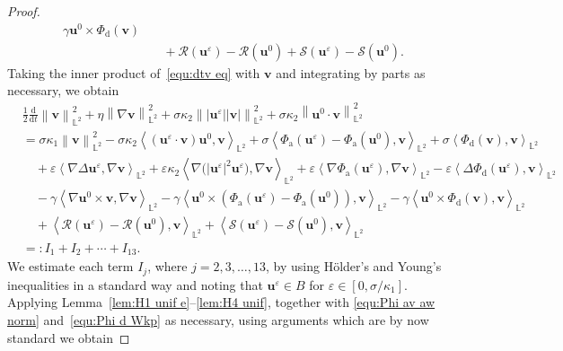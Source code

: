 \documentclass[11pt, reqno]{amsart}
\theoremstyle{definition}
\numberwithin{equation}{section}
\newcommand{\bff}{\boldsymbol}
\newcommand{\bb}{\mathbb}
\newcommand{\ddt}{\frac{\mathrm{d}}{\mathrm{d}t}}
\newcommand{\norm}[2]{\left\|{#1}\right\|_{#2}}
\newcommand{\inpro}[2]{\left\langle#1,#2\right\rangle}
\begin{document}
\begin{proof}
\begin{align}
    \gamma \bff{u}^0 \times \Phi_{\mathrm{d}}(\bff{v})
    \nonumber\\
    &\quad
    +
    \mathcal{R}(\bff{u}^\varepsilon)- \mathcal{R}(\bff{u}^0)
    +
    \mathcal{S}(\bff{u}^\varepsilon)- \mathcal{S}(\bff{u}^0).
\end{align}
Taking the inner product of~\eqref{equ:dtv eq} with $\bff{v}$ and integrating by parts as necessary, we obtain
\begin{align}\label{equ:I1 to I12 Se}
    &\frac12 \ddt \norm{\bff{v}}{\bb{L}^2}^2
    +
    \eta \norm{\nabla \bff{v}}{\bb{L}^2}^2
    +
    \sigma\kappa_2 \norm{|\bff{u}^\varepsilon| |\bff{v}|}{\bb{L}^2}^2
    +
    \sigma\kappa_2 \norm{\bff{u}^0 \cdot \bff{v}}{\bb{L}^2}^2
    \nonumber\\
    &=
    \sigma\kappa_1 \norm{\bff{v}}{\bb{L}^2}^2
    -
    \sigma\kappa_2 \inpro{(\bff{u}^\varepsilon \cdot \bff{v})\bff{u}^0}{\bff{v}}_{\bb{L}^2}
    +
    \sigma \inpro{\Phi_{\mathrm{a}}(\bff{u}^\varepsilon)- \Phi_{\mathrm{a}}(\bff{u}^0)}{\bff{v}}_{\bb{L}^2}
    +
    \sigma \inpro{\Phi_{\mathrm{d}}(\bff{v})}{\bff{v}}_{\bb{L}^2}
    \nonumber\\
    &\quad
    +
    \varepsilon \inpro{\nabla\Delta \bff{u}^\varepsilon}{\nabla \bff{v}}_{\bb{L}^2}
    +
    \varepsilon\kappa_2 \inpro{\nabla\big(|\bff{u}^\varepsilon|^2 \bff{u}^\varepsilon\big)}{\nabla \bff{v}}_{\bb{L}^2}
    +
    \varepsilon \inpro{\nabla \Phi_{\mathrm{a}}(\bff{u}^\varepsilon)}{\nabla \bff{v}}_{\bb{L}^2}
    -
    \varepsilon \inpro{\Delta \Phi_{\mathrm{d}}(\bff{u}^\varepsilon)}{\bff{v}}_{\bb{L}^2}
    \nonumber\\
    &\quad
    -
    \gamma \inpro{\nabla \bff{u}^0 \times \bff{v}}{\nabla \bff{v}}_{\bb{L}^2}
    -
    \gamma \inpro{\bff{u}^0 \times \left(\Phi_{\mathrm{a}}(\bff{u}^\varepsilon)- \Phi_{\mathrm{a}}(\bff{u}^0)\right)}{\bff{v}}_{\bb{L}^2}
    -
    \gamma \inpro{\bff{u}^0 \times \Phi_{\mathrm{d}}(\bff{v})}{\bff{v}}_{\bb{L}^2}
    \nonumber\\
    &\quad
    +
    \inpro{\mathcal{R}(\bff{u}^\varepsilon)- \mathcal{R}(\bff{u}^0)}{\bff{v}}_{\bb{L}^2}
    +
    \inpro{\mathcal{S}(\bff{u}^\varepsilon)- \mathcal{S}(\bff{u}^0)}{\bff{v}}_{\bb{L}^2}
    \nonumber\\
    &=:
    I_1+I_2+\cdots +I_{13}.
\end{align}
We estimate each term $I_j$, where $j=2,3,\ldots, 13$, by using H\"older's and Young's inequalities in a standard way and noting that $\bff{u}^\varepsilon \in B$ for $\varepsilon\in [0,\sigma/\kappa_1]$. Applying Lemma~\ref{lem:H1 unif e}--\ref{lem:H4 unif}, together with \eqref{equ:Phi av aw norm} and~\eqref{equ:Phi d Wkp} as necessary, using arguments which are by now standard we obtain

\end{proof}
\end{document}
